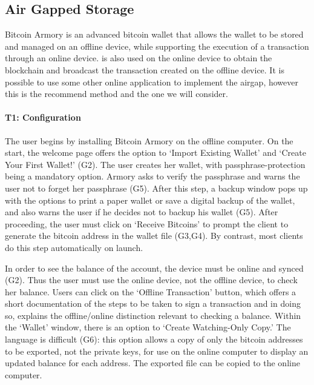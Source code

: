 
\subsection{Air Gapped Storage}
\label{air gap}

Bitcoin Armory is an advanced bitcoin wallet that allows the wallet to be stored and managed on an offline device, while supporting the execution of a transaction through an online device. \armory is also used on the online device to obtain the blockchain and broadcast the transaction created on the offline device. It is possible to use some other online application to implement the airgap, however this is the recommend method and the one we will consider.

\paragraph{T1: Configuration} 

The user begins by installing Bitcoin Armory on the offline computer. On the start, the welcome page offers the option to `Import Existing Wallet' and `Create Your First Wallet!' (G2). The user creates her wallet, with passphrase-protection being a mandatory option. Armory asks to verify the passphrase and warns the user not to forget her passphrase (G5). After this step, a backup window pops up with the options to print a paper wallet or save a digital backup of the wallet, and also warns the user if he decides not to backup his wallet (G5). After proceeding, the user must click on `Receive Bitcoins' to prompt the client to generate the bitcoin address in the wallet file (G3,G4). By contrast, most clients do this step automatically on launch. 

In order to see the balance of the account, the device must be online and synced (G2). Thus the user must use the online device, not the offline device, to check her balance. Users can click on the `Offline Transaction' button, which offers a short documentation of the steps to be taken to sign a transaction and in doing so, explains the offline/online distinction relevant to checking a balance. Within the `Wallet' window, there is an option to `Create Watching-Only Copy.' The language is difficult (G6): this option allows a copy of only the bitcoin addresses to be exported, not the private keys, for use on the online computer to display an updated balance for each address. The exported file can be copied to the online computer.

